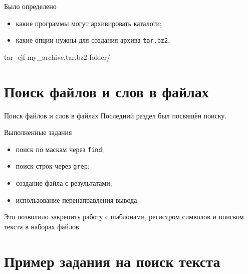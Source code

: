 \documentclass[
  11pt,
  ignorenonframetext,
  aspectratio=169,
  russian,
]{beamer}
\newenvironment{Shaded}{\begin{snugshade}}{\end{snugshade}}
\newcommand{\AttributeTok}[1]{\textcolor[rgb]{0.40,0.45,0.13}{#1}}
\newcommand{\FunctionTok}[1]{\textcolor[rgb]{0.28,0.35,0.67}{#1}}
\newcommand{\NormalTok}[1]{\textcolor[rgb]{0.00,0.23,0.31}{#1}}
\providecommand{\tightlist}{%
  \setlength{\itemsep}{0pt}\setlength{\parskip}{0pt}}
\begin{document}
\begin{frame}[fragile]{Было определено}
\protect{}\label{ux431ux44bux43bux43e-ux43eux43fux440ux435ux434ux435ux43bux435ux43dux43e}
\begin{itemize}[<+->]
\tightlist
\item
  какие программы могут архивировать каталоги;
\item
  какие опции нужны для создания архива \texttt{tar.bz2}.
\end{itemize}

\begin{Shaded}
\begin{Highlighting}[]
\FunctionTok{tar} \AttributeTok{{-}cjf}\NormalTok{ my\_archive.tar.bz2 folder/}
\end{Highlighting}
\end{Shaded}
\end{frame}

\section{Поиск файлов и слов в
файлах}\label{ux43fux43eux438ux441ux43a-ux444ux430ux439ux43bux43eux432-ux438-ux441ux43bux43eux432-ux432-ux444ux430ux439ux43bux430ux445}

\begin{frame}{Поиск файлов и слов в файлах}
Последний раздел был посвящён поиску.
\end{frame}

\begin{frame}[fragile]{Выполненные задания}
\protect{}\label{ux432ux44bux43fux43eux43bux43dux435ux43dux43dux44bux435-ux437ux430ux434ux430ux43dux438ux44f}
\begin{itemize}[<+->]
\tightlist
\item
  поиск по маскам через \texttt{find};
\item
  поиск строк через \texttt{grep};
\item
  создание файла с результатами;
\item
  использование перенаправления вывода.
\end{itemize}

Это позволило закрепить работу с шаблонами, регистром символов и поиском
текста в наборах файлов.
\end{frame}

\section{Пример задания на поиск
текста}\label{ux43fux440ux438ux43cux435ux440-ux437ux430ux434ux430ux43dux438ux44f-ux43dux430-ux43fux43eux438ux441ux43a-ux442ux435ux43aux441ux442ux430}
\end{document}
